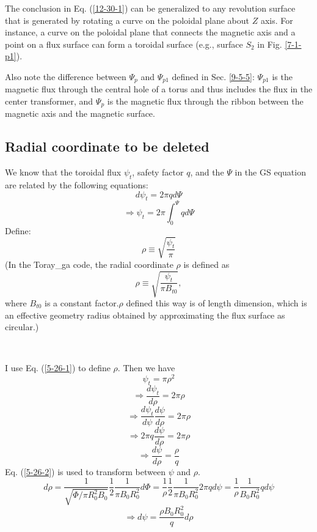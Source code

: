 \documentclass{article}
\begin{document}
The conclusion in Eq. (\ref{12-30-1}) can be generalized to any revolution
surface that is generated by rotating a curve on the poloidal plane about $Z$
axis. For instance, a curve on the poloidal plane that connects the magnetic
axis and a point on a flux surface can form a toroidal surface (e.g., surface
$S_2$ in Fig. \ref{7-1-p1}).

Also note the difference between $\Psi_p$ and $\Psi_{p 1}$ defined in Sec.
\ref{9-5-5}: $\Psi_{p 1}$ is the magnetic flux through the central hole of a
torus and thus includes the flux in the center transformer, and $\Psi_p$ is
the magnetic flux through the ribbon between the magnetic axis and the
magnetic surface.

\subsection{Radial coordinate to be deleted}

We know that the toroidal flux $\psi_t$, safety factor $q$, and the $\Psi$ in
the GS equation are related by the following equations:
\begin{equation}
  d \psi_t = 2 \pi q d \Psi
\end{equation}
\begin{equation}
  \Longrightarrow \psi_t = 2 \pi \int_0^{\Psi} q d \Psi
\end{equation}
Define:
\begin{equation}
  \label{5-26-1} \rho \equiv \sqrt{\frac{\psi_t}{\pi}}
\end{equation}
(In the Toray\_ga code, the radial coordinate $\rho$ is defined as
\begin{equation}
  \label{3-21-a1} \rho \equiv \sqrt{\frac{\psi_t}{\pi B_{t 0}}},
\end{equation}
where $B_{t 0}$ is a constant factor.$\rho$ defined this way is of length
dimension, which is an effective geometry radius obtained by approximating the
flux surface as circular.)

\

I use Eq. (\ref{5-26-1}) to define $\rho$. Then we have
\begin{equation}
  \psi_t = \pi \rho^2
\end{equation}
\begin{equation}
  \Longrightarrow \frac{d \psi_t}{d \rho} = 2 \pi \rho
\end{equation}
\begin{equation}
  \Longrightarrow \frac{d \psi_t}{d \psi}  \frac{d \psi}{d \rho} = 2 \pi \rho
\end{equation}
\begin{equation}
  \Longrightarrow 2 \pi q \frac{d \psi}{d \rho} = 2 \pi \rho
\end{equation}
\begin{equation}
  \label{5-26-2} \Longrightarrow \frac{d \psi}{d \rho} = \frac{\rho}{q}
\end{equation}
Eq. (\ref{5-26-2}) is used to transform between $\psi$ and $\rho$.
\[ d \rho = \frac{1}{\sqrt{\Phi / \pi R_0^2 B_0}} \frac{1}{2} \frac{1}{\pi B_0
   R_0^2} d \Phi = \frac{1}{\rho} \frac{1}{2} \frac{1}{\pi B_0 R_0^2} 2 \pi q
   d \psi = \frac{1}{\rho} \frac{1}{B_0 R_0^2} q d \psi \]
\[ \Rightarrow d \psi = \frac{\rho B_0 R_0^2}{q} d \rho \]
\end{document}
